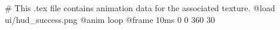 # This .tex file contains animation data for the associated texture.
@load ui/hud_success.png
@anim loop
	@frame 10ms 0 0 360 30